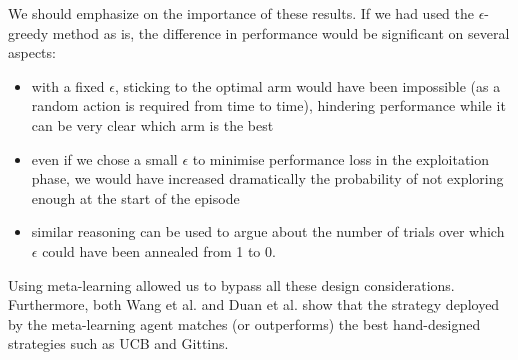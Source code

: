 We should emphasize on the importance of these results. If we had used the 
$\epsilon$-greedy method as is, the difference in performance would be 
significant on several aspects:
\begin{itemize}
	\item with a fixed $\epsilon$, sticking to the optimal arm would have
		been impossible (as a random action is required from time to 
		time), hindering performance while it can be very clear
		which arm is the best
	\item even if we chose a small $\epsilon$ to minimise performance loss
		in the exploitation phase, we would have increased dramatically
		the probability of not exploring enough at the start of the 
		episode
	\item similar reasoning can be used to argue about the number of 
		trials over which $\epsilon$ could have been annealed from
		1 to 0.
\end{itemize}
Using meta-learning allowed us to bypass all these design considerations.
Furthermore, both Wang et al. \cite{learningtorl} and Duan et al. 
\cite{fastrlviaslowrl} show that the strategy deployed by the meta-learning
agent matches (or outperforms) the best hand-designed strategies such as 
UCB and Gittins.\\

